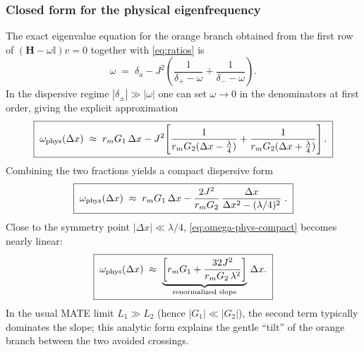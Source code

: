 \subsubsection*{Closed form for the physical eigenfrequency}
The exact eigenvalue equation for the orange branch obtained from the first row of \((\mathbf H-\omega\mathbb I)v=0\) together with \eqref{eq:ratios} is
\begin{equation}
\label{eq:selfconsistent}
\omega \;=\; \delta_a - J^2\!\left(\frac{1}{\delta_+ - \omega}+\frac{1}{\delta_- - \omega}\right).
\end{equation}
In the dispersive regime \(|\delta_\pm|\gg |\omega|\) one can set \(\omega\to 0\) in the denominators at first order, giving the explicit approximation
\begin{equation}
\label{eq:omega-phys-first}
\boxed{\;
\omega_{\rm phys}(\Delta x)\;\approx\; r_m G_1\,\Delta x
- J^2\!\left[\frac{1}{r_m G_2(\Delta x-\tfrac{\lambda}{4})}
+\frac{1}{r_m G_2(\Delta x+\tfrac{\lambda}{4})}\right].
\;}
\end{equation}
Combining the two fractions yields a compact dispersive form
\begin{equation}
\label{eq:omega-phys-compact}
\boxed{\;
\omega_{\rm phys}(\Delta x)\;\approx\;
r_m G_1\,\Delta x
-\frac{2J^2}{r_m G_2}\,
\frac{\Delta x}{\Delta x^2-(\lambda/4)^2}\;.
\;}
\end{equation}
Close to the symmetry point \(|\Delta x|\ll \lambda/4\), \eqref{eq:omega-phys-compact} becomes nearly linear:
\begin{equation}
\label{eq:omega-linear}
\boxed{\;
\omega_{\rm phys}(\Delta x)\;\approx\;
\underbrace{\left[r_m G_1+\frac{32J^2}{r_m G_2\,\lambda^2}\right]}_{\text{renormalized slope}}
\,\Delta x .
\;}
\end{equation}
In the usual MATE limit \(L_1\gg L_2\) (hence \(|G_1|\ll |G_2|\)), the second term typically dominates the slope; this analytic form explains the gentle ``tilt'' of the orange branch between the two avoided crossings.

